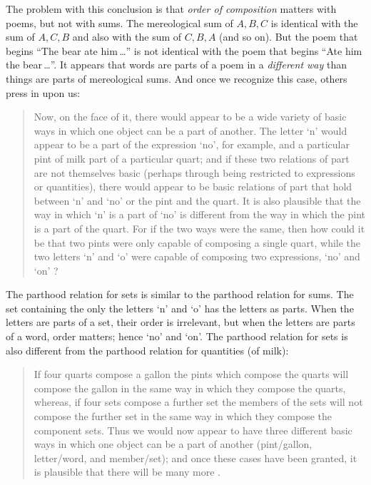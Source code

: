 \documentclass[12pt,twoside]{reedfancy}
\begin{document}
\begin{spacing}{1.25}
The problem with this conclusion is that {\em order of composition}
matters with poems, but not with sums.  The mereological sum of $A, B,
C$ is identical with the sum of $A, C, B$ and also with the sum of $C,
B, A$ (and so on).  But the poem that begins ``The bear ate
him\,\ldots '' is not identical with the poem that begins ``Ate him
the bear\,\ldots ''.  It appears that words are parts of a poem in a
{\em different way} than things are parts of mereological sums.  And
once we recognize this case, others press in upon us:

\begin{quote}
Now, on the face of it, there would appear to be a wide variety of
basic ways in which one object can be a part of another.  The letter
`n' would appear to be a part of the expression `no', for example, and
a particular pint of milk part of a particular quart; and if these two
relations of part are not themselves basic (perhaps through being
restricted to expressions or quantities), there would appear to be
basic relations of part that hold between `n' and `no' or the pint and
the quart.  It is also plausible that the way in which `n' is a part
of `no' is different from the way in which the pint is a part of the
quart.  For if the two ways were the same, then how could it be that
two pints were only capable of composing a single quart, while the two
letters `n' and `o' were capable of composing two expressions, `no'
and `on' \citep[562]{fine2010}?
\end{quote}

The parthood relation for sets is similar to the parthood relation for
sums.  The set containing the only the letters `n' and `o' has the
letters as parts.  When the letters are parts of a set, their order is
irrelevant, but when the letters are parts of a word, order matters;
hence `no' and `on'.  The parthood relation for sets is also different
from the parthood relation for quantities (of milk):

\begin{quote}
If four quarts compose a gallon the pints which compose the quarts
will compose the gallon in the same way in which they compose the
quarts, whereas, if four sets compose a further set the members of the
sets will not compose the further set in the same way in which they
compose the component sets.  Thus we would now appear to have three
different basic ways in which one object can be a part of another
(pint/gallon, letter/word, and member/set); and once these cases have
been granted, it is plausible that there will be many more
\citep[562]{fine2010}.
\end{quote}


\end{spacing}
\end{document}
